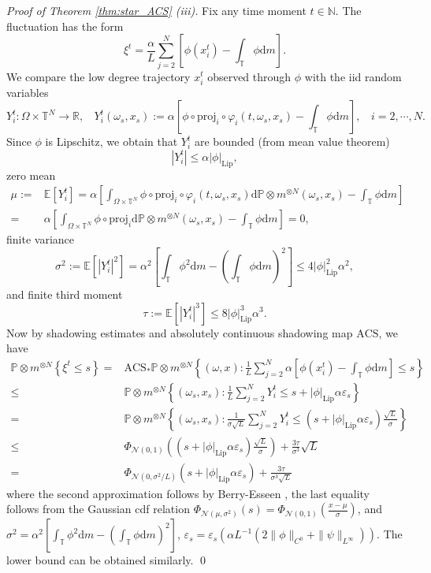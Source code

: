 \documentclass[a4paper]{article}
\theoremstyle{plain}
\theoremstyle{definition}
\newcommand{\E}{\mathbb{E}}
\newcommand{\PP}{\mathbb{P}}
\newcommand{\R}{\mathbb{R}}
\newcommand{\T}{\mathbb{T}}
\newcommand{\N}{\mathbb{N}}
\newcommand{\Nil}{\mathcal{N}}
\begin{document}
\noindent \textit{Proof of Theorem \ref{thm:star_ACS} (iii).} 
Fix any time moment $t\in\N$. The fluctuation has the form
\[
\xi^t = \frac{\alpha}{L} \sum_{j=2}^N  \left[ \phi(x_i^t) -\int_{\T}\phi\mathrm{d}m \right].
\]
We compare the low degree trajectory $x_i^t$ observed through $\phi$ with the iid random variables
$$Y_i^t:\Omega\times \T^N\to\R,~~~~Y_i^t(\omega_s,x_s):= \alpha\left[ \phi \circ \mathrm{proj}_i\circ \varphi_i(t,\omega_s,x_s) - \int_{\T}\phi\mathrm{d}m\right],~~~~i=2,\cdots,N.$$
Since $\phi$ is Lipschitz, we obtain that $Y_i^t$ are bounded (from mean value theorem)
\[
|Y_i^t| \leq \alpha |\phi|_{\mathrm{Lip}},
\]
zero mean
\begin{align*}
	\mu:=&\E[Y_i^t]=\alpha\left[\int_{\Omega\times\T^N} \phi\circ \mathrm{proj}_i\circ \varphi_i(t,\omega_s,x_s)\mathrm{d}\PP\otimes m^{\otimes N}(\omega_s,x_s) - \int_{\T}\phi\mathrm{d}m\right]\\
	=&\alpha\left[\int_{\Omega\times\T^N} \phi\circ \mathrm{proj}_i \mathrm{d}\PP\otimes m^{\otimes N}(\omega_s,x_s) - \int_{\T}\phi\mathrm{d}m\right] =0,
\end{align*}
finite variance
$$\sigma^2:=\E[|Y_i^t|^2] = \alpha^2 \left[\int_{\T}\phi^2\mathrm{d}m - \left(\int_{\T}\phi\mathrm{d}m\right)^2\right] \leq 4|\phi|_{\mathrm{Lip}}^2\alpha^2,$$
and finite third moment
$$\tau:=\E[|Y_i^t|^3] \leq 8|\phi|_{\mathrm{Lip}}^3\alpha^3.$$
Now by shadowing estimates and absolutely continuous shadowing map $\mathrm{ACS}$, we have
\begin{align*}
	\PP\otimes m^{\otimes N}\left\{\xi^t \leq s\right\} =&\mathrm{ACS}_*\PP\otimes m^{\otimes N}\left\{(\omega,x): \frac{1}{L} \sum_{j=2}^N  \alpha\left[ \phi(x_i^t) -\int_{\T}\phi\mathrm{d}m \right] \leq s\right\} \\
	\leq& \PP\otimes m^{\otimes N}\left\{(\omega_s,x_s): \frac{1}{L} \sum_{j=2}^N  Y_i^t\leq s + |\phi|_{\mathrm{Lip}} \alpha\varepsilon_s\right\} \\
	=& \PP\otimes m^{\otimes N}\left\{(\omega_s,x_s): \frac{1}{\sigma \sqrt{L}} \sum_{j=2}^N  Y_i^t\leq (s + |\phi|_{\mathrm{Lip}} \alpha\varepsilon_s) \frac{\sqrt{L}}{\sigma}\right\} \\
	\leq & \Phi_{\Nil(0,1)}\left((s+ |\phi|_{\mathrm{Lip}}\alpha\varepsilon_s )\frac{\sqrt{L}}{\sigma}\right) + \frac{3\tau}{\sigma^3}\sqrt{L} \\
	=& \Phi_{\Nil(0,\sigma^2/L)}\left(s+ |\phi|_{\mathrm{Lip}}\alpha\varepsilon_s \right) + \frac{3\tau}{\sigma^3\sqrt{L} }
\end{align*}
where the second approximation follows by Berry-Esseen \cite[Theorem 3.4.9]{Durrett2019}, the last equality follows from the Gaussian cdf relation $\Phi_{\Nil(\mu,\sigma^2)}(s) = \Phi_{\Nil(0,1)}\left(\frac{x-\mu}{\sigma}\right)$, and $\sigma^2 =\alpha^2 \left[\int_{\T}\phi^2\mathrm{d}m - \left(\int_{\T}\phi\mathrm{d}m\right)^2\right] $, $\varepsilon_s = \varepsilon_s \left(\alpha L^{-1} \left( 2\|\phi\|_{C^0}+ \|\psi\|_{L^{\infty}} \right) \right)$. The lower bound can be obtained similarly.
\qed
\end{document}
